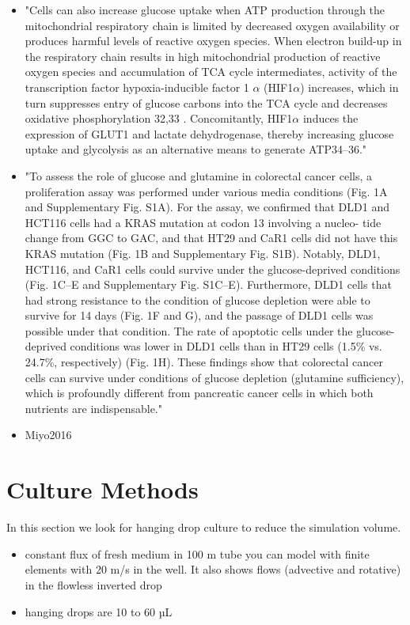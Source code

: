 \documentclass[11pt,a4paper]{article}
\begin{document}
\begin{itemize}
\item "Cells can also increase
glucose uptake when ATP production through the mitochondrial
respiratory chain is limited by decreased oxygen availability or produces
harmful levels of reactive oxygen species. When electron build-up in the
respiratory chain results in high mitochondrial production of reactive
oxygen species and accumulation of TCA cycle intermediates, activity of
the transcription factor hypoxia-inducible factor 1 $\alpha$ (HIF1$\alpha$) increases,
which in turn suppresses entry of glucose carbons into the TCA cycle
and decreases oxidative phosphorylation 32,33 . Concomitantly, HIF1$\alpha$
induces the expression of GLUT1 and lactate dehydrogenase, thereby
increasing glucose uptake and glycolysis as an alternative means to
generate ATP34–36."\cite{Palm2017}
\item "To assess the role of glucose and glutamine in colorectal cancer cells, a proliferation assay was performed under various media conditions (Fig. 1A and Supplementary Fig. S1A). For the assay, we confirmed that DLD1 and HCT116 cells had a KRAS mutation at codon 13 involving a nucleo-
tide change from GGC to GAC, and that HT29 and CaR1 cells did not have this KRAS mutation (Fig. 1B and Supplementary Fig. S1B). Notably, DLD1, HCT116, and CaR1 cells could survive under the glucose-deprived conditions (Fig. 1C–E and Supplementary Fig. S1C–E). Furthermore, DLD1 cells that had strong resistance to the condition of glucose depletion were able to survive for 14 days (Fig. 1F and G), and the passage of DLD1 cells was possible under that condition. The rate of apoptotic cells under the glucose-deprived conditions was lower in DLD1 cells than in HT29 cells (1.5\% vs. 24.7\%, respectively) (Fig. 1H). These findings show that colorectal cancer cells can survive under conditions of glucose depletion (glutamine sufficiency), which is profoundly different from pancreatic cancer cells in which both nutrients are indispensable."\item{Miyo2016}
\end{itemize}

\section{Culture Methods}
In this section we look for hanging drop culture to reduce the simulation volume.
\begin{itemize}
\item constant flux of fresh medium in 100 \textmu m tube you can model with finite elements with 20 \textmu m/s in the well. It also shows flows (advective and rotative) in the flowless inverted drop  \cite{HuangS2020}
\item hanging drops are 10 to 60 µL \cite{Foty2011}\cite{Jeong2022} 
\end{itemize}
\end{document}
